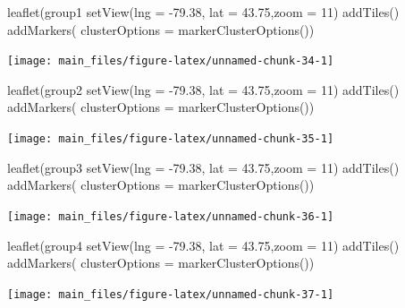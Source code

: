 \begin{Schunk}
\begin{Sinput}
leaflet(group1 %
  setView(lng = -79.38, lat = 43.75,zoom = 11) %
   addTiles() %
  addMarkers(
  clusterOptions = markerClusterOptions())
\end{Sinput}


\begin{center}\texttt{[image: main\_files/figure-latex/unnamed-chunk-34-1]} \end{center}

\end{Schunk}

\begin{Schunk}
\begin{Sinput}
leaflet(group2 %
  setView(lng = -79.38, lat = 43.75,zoom = 11) %
   addTiles() %
  addMarkers(
  clusterOptions = markerClusterOptions())
\end{Sinput}


\begin{center}\texttt{[image: main\_files/figure-latex/unnamed-chunk-35-1]} \end{center}

\end{Schunk}

\begin{Schunk}
\begin{Sinput}
leaflet(group3 %
  setView(lng = -79.38, lat = 43.75,zoom = 11) %
   addTiles() %
  addMarkers(
  clusterOptions = markerClusterOptions())
\end{Sinput}


\begin{center}\texttt{[image: main\_files/figure-latex/unnamed-chunk-36-1]} \end{center}

\end{Schunk}

\begin{Schunk}
\begin{Sinput}
leaflet(group4 %
  setView(lng = -79.38, lat = 43.75,zoom = 11) %
   addTiles() %
  addMarkers(
  clusterOptions = markerClusterOptions())
\end{Sinput}


\begin{center}\texttt{[image: main\_files/figure-latex/unnamed-chunk-37-1]} \end{center}

\end{Schunk}

